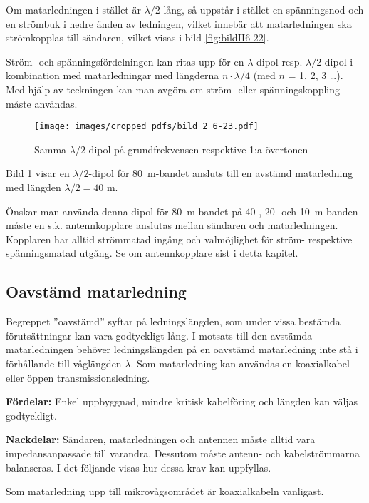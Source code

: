 Om matarledningen i stället är \(\lambda/2\) lång, så uppstår i
stället en spänningsnod och en strömbuk i nedre änden av ledningen,
vilket innebär att matarledningen ska strömkopplas till sändaren,
vilket visas i bild \ref{fig:bildII6-22}.

Ström- och spänningsfördelningen kan ritas upp för en \(\lambda\)-dipol resp.
\(\lambda/2\)-dipol i kombination med matarledningar med längderna
\(n \cdot \lambda/4\) (med \(n\) = 1, 2, 3 \dots).
Med hjälp av teckningen kan man avgöra om ström- eller spänningskoppling måste
användas.

\begin{figure}
  \texttt{[image: images/cropped\_pdfs/bild\_2\_6-23.pdf]}
  \caption{Samma $\lambda/2$-dipol på grundfrekvensen respektive 1:a övertonen}
  \label{fig:bildII6-23}
\end{figure}

Bild \ref{fig:bildII6-23} visar en \(\lambda/2\)-dipol för 80~m-bandet ansluts
till en avstämd matarledning med längden \(\lambda/2 = 40\) m.

Önskar man använda denna dipol för 80~m-bandet på 40-, 20- och 10~m-banden
måste en s.k. antennkopplare anslutas mellan sändaren och matarledningen.
Kopplaren har alltid strömmatad ingång och valmöjlighet för ström- respektive
spänningsmatad utgång.
Se om antennkopplare sist i detta kapitel.

\subsection{Oavstämd matarledning}

Begreppet ''oavstämd'' syftar på ledningslängden, som under vissa
bestämda förutsättningar kan vara godtyckligt lång.
I motsats till den avstämda matarledningen behöver ledningslängden på en
oavstämd matarledning inte stå i förhållande till våglängden \(\lambda\).
Som matarledning kan användas en koaxialkabel eller öppen transmissionsledning.

\textbf{Fördelar:}
Enkel uppbyggnad, mindre kritisk kabelföring och längden kan väljas godtyckligt.

\textbf{Nackdelar:}
Sändaren, matarledningen och antennen måste alltid vara impedansanpassade till
varandra.
Dessutom måste antenn- och kabelströmmarna balanseras.
I det följande visas hur dessa krav kan uppfyllas.

Som matarledning upp till mikrovågsområdet är koaxialkabeln vanligast.

